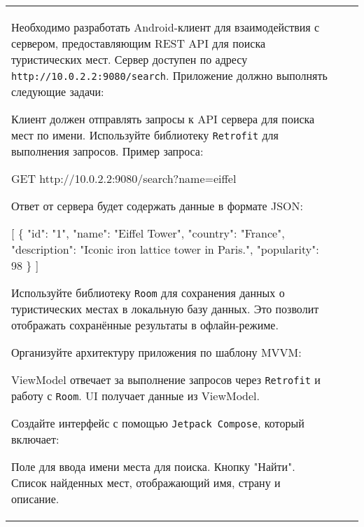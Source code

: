 \documentclass[a4paper]{article}
\begin{document}
\begin{tabular}{!{\vrule width 2pt}p{5cm}|p{6cm}|p{4cm}!{\vrule width 2pt}}
{\begin{minipage}{16cm}
\begin{enumerate}
Необходимо разработать Android-клиент для взаимодействия с сервером, предоставляющим REST API для поиска туристических мест. Сервер доступен по адресу \texttt{http://10.0.2.2:9080/search}. Приложение должно выполнять следующие задачи:


Клиент должен отправлять запросы к API сервера для поиска мест по имени. Используйте библиотеку \texttt{Retrofit} для выполнения запросов. Пример запроса:

 GET http://10.0.2.2:9080/search?name=eiffel 

Ответ от сервера будет содержать данные в формате JSON:

 [ \{ "id": "1", "name": "Eiffel Tower", 
    "country": "France", "description": "Iconic iron lattice tower in Paris.", 
    "popularity": 98 \} ] 


Используйте библиотеку \texttt{Room} для сохранения данных о туристических местах в локальную базу данных. Это позволит отображать сохранённые результаты в офлайн-режиме.


Организуйте архитектуру приложения по шаблону MVVM:

ViewModel отвечает за выполнение запросов через \texttt{Retrofit} и работу с \texttt{Room}.
UI получает данные из ViewModel.

Создайте интерфейс с помощью \texttt{Jetpack Compose}, который включает:

Поле для ввода имени места для поиска.
Кнопку "Найти".
Список найденных мест, отображающий имя, страну и описание.


\end{enumerate}
\end{minipage}}
\end{tabular}
\end{document}
